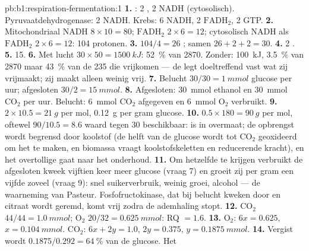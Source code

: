 \begin{solution}{pb:b1:respiration-fermentation:1}
\textbf{1.} : 2 , 2 NADH (cytosolisch). Pyruvaatdehydrogenase: 2 NADH.
Krebs: 6 NADH, 2 $\mathrm{FADH_2}$, 2 GTP.
\textbf{2.} Mitochondriaal NADH $8\times 10 = 80$; $\mathrm{FADH_2}$
$2\times 6 = 12$; cytosolisch NADH als $\mathrm{FADH_2}$ $2\times 6 = 12$: 104
protonen.
\textbf{3.} $104/4 = 26$ ; samen $26 + 2 + 2 = 30$.
\textbf{4.} 2 .
\textbf{5.} 15.
\textbf{6.} Met lucht $30\times 50 = \qty{1500}{kJ}$: \qty{52}{\%} van 2870.
Zonder: \qty{100}{kJ}, \qty{3.5}{\%} van 2870 maar \qty{43}{\%} van de 235 die
vrijkomen --- de  legt doeltreffend vast wat zij vrijmaakt; zij maakt alleen
weinig vrij.
\textbf{7.} Belucht $30/30 = \qty{1}{mmol}$ glucose per uur; afgesloten
$30/2 = \qty{15}{mmol}$.
\textbf{8.} Afgesloten: \qty{30}{mmol} ethanol en \qty{30}{mmol} $\mathrm{CO_2}$
per uur. Belucht: \qty{6}{mmol} $\mathrm{CO_2}$ afgegeven en \qty{6}{mmol}
$\mathrm{O_2}$ verbruikt.
\textbf{9.} $2\times 10.5 = \qty{21}{g}$ per mol, \qty{0.12}{g} per gram glucose.
\textbf{10.} $0.5\times 180 = \qty{90}{g}$ per mol, oftewel $90/10.5 =
8.6$  waard tegen 30 beschikbaar:  is in overmaat; de opbrengst wordt
begrensd door koolstof (de helft van de glucose wordt tot $\mathrm{CO_2}$
geoxideerd om het  te maken, en biomassa vraagt koolstofskeletten en
reducerende kracht), en het overtollige  gaat naar het onderhoud.
\textbf{11.} Om hetzelfde  te krijgen verbruikt de afgesloten kweek vijftien
keer meer glucose (vraag 7) en groeit zij per gram een vijfde zoveel (vraag 9):
snel suikerverbruik, weinig groei, alcohol --- de waarneming van Pasteur.
Fosfofructokinase, dat bij belucht kweken door  en citraat wordt geremd, komt
vrij zodra de ademhaling stopt.
\textbf{12.} $\mathrm{CO_2}$ $44/44 = \qty{1.0}{mmol}$; $\mathrm{O_2}$
$20/32 = \qty{0.625}{mmol}$: RQ $= 1.6$.
\textbf{13.} $\mathrm{O_2}$: $6x = 0.625$, $x = \qty{0.104}{mmol}$.
$\mathrm{CO_2}$: $6x + 2y = 1.0$, $2y = 0.375$, $y = \qty{0.1875}{mmol}$.
\textbf{14.} Vergist wordt $0.1875/0.292 = \qty{64}{\%}$ van de glucose. Het 

\end{solution}
